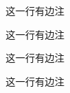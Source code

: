 \documentclass[twoside]{ctexart} %
\begin{document}


            
            

            这一行有边注

            {这一行有边注
            \reversemarginpar
            
            这一行有边注
            
            }

            这一行有边注

\end{document}
